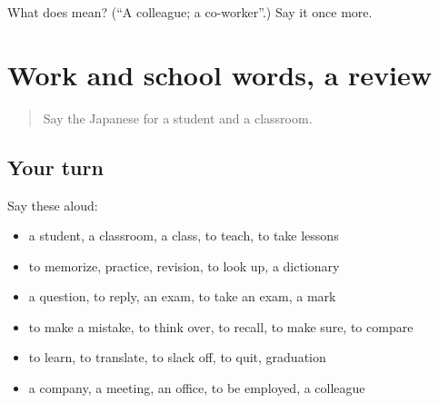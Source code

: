 \begin{tcolorbox}[breakable,colback=teal!4,colframe=teal!35!black,title={Before you move on}]
What does  mean? (\textquotedblleft{}A colleague; a co-worker\textquotedblright{}.) Say it once more.
\end{tcolorbox}
\section[(dialogue)]{Work and school words, a review}

\label{lesson:JA-R229-review-224-229}



\begin{quote}
Say the Japanese for a student and a classroom.
\end{quote}

\subsection*{Your turn}
Say these aloud:

\begin{itemize}
\raggedright
  \item a student, a classroom, a class, to teach, to take lessons
  \item to memorize, practice, revision, to look up, a dictionary
  \item a question, to reply, an exam, to take an exam, a mark
  \item to make a mistake, to think over, to recall, to make sure, to compare
  \item to learn, to translate, to slack off, to quit, graduation
  \item a company, a meeting, an office, to be employed, a colleague
\end{itemize}

